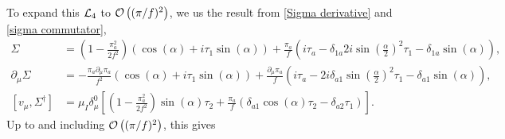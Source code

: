 \documentclass{article}
\begin{document}
To expand this $\Ell_4$ to $\Oh[2]{(\pi/f)}$, we us the result from \autoref{Sigma derivative} and \autoref{sigma commutator},
\begin{align*}
    \Sigma & =
    \left(
       1 
       - \frac{\pi_a^2}{2f^2}
   \right)
   (\cos(\alpha) + i \tau_1 \sin(\alpha))
   +  \frac{\pi_a}{f}    \left(
       i\tau_a 
       - \delta_{1a} 2i \sin(\frac{\alpha}{2})^2 \tau_1 
       - \delta_{1a} \sin(\alpha)
   \right), \\
    \partial_\mu \Sigma 
    & = 
    - \frac{\pi_a \partial_\mu \pi_a}{f^2}
    \left(\cos(\alpha) + i \tau_1 \sin(\alpha)\right)
    + \frac{\partial_\mu \pi_a}{f}
    \left(
        i\tau_a 
        -2 i \delta_{a1} \sin(\frac{\alpha}{2})^2 \tau_1 
        - \delta_{a1}\sin(\alpha)\right), \\
    [v_\mu, \Sigma^\dagger] 
    & =
    \mu_I \delta^0_\mu
    \left[
        \left( 1 - \frac{\pi_a^2}{2f^2} \right) \sin(\alpha) \tau_2
        + \frac{\pi_a}{f}
        \left(
            \delta_{a1} \cos(\alpha) \tau_2 - \delta_{a2} \tau_1
        \right)
    \right].
    \end{align*}
Up to and including $\Oh{(\pi/f)}$, this gives
\end{document}
